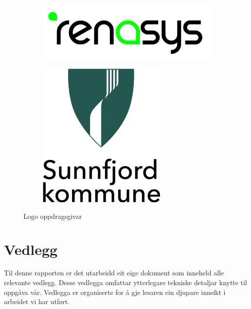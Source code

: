 \begin{figure}[htbp]
    \centering
    \begin{subfigure}[b]{0.3\textwidth}
        \centering
        \includegraphics[width=1\textwidth]{Bilder/renasys.png}
    \end{subfigure}
    \hfill
    \begin{subfigure}[b]{0.3\textwidth}
        \centering
        \includegraphics[width=0.7\textwidth]{Bilder/SK.png}
    \end{subfigure}
    \caption{Logo oppdragsgivar}\label{fig:Oppdragsgivar}
\end{figure}

\section{Vedlegg}
Til denne rapporten er det utarbeidd eit eige dokument som inneheld alle relevante vedlegg. 
Desse vedlegga omfattar ytterlegare tekniske detaljar knytte til oppgåva vår.\newline
Vedlegga er organiserte for å gje lesaren ein djupare innsikt i arbeidet vi har utført.